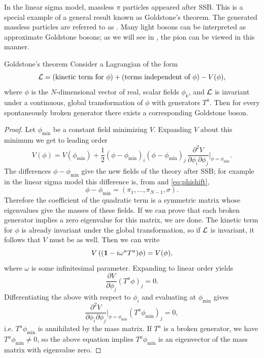 In the linear sigma model, massless $\pi$ particles appeared after
SSB. This is a special example of a general result
known as Goldstone's theorem. The generated massless particles are
referred to as . 
Many light bosons can be interpreted
as approximate Goldstone bosons; as we will see in ,
the pion can be viewed in this manner.
\begin{theorem}{Goldstone's theorem}{}
Consider a Lagrangian of the form
$$
  \mathcal{L}=(\text{kinetic term for $\phi$})+
        (\text{terms independent of $\phi$})-V(\phi),
$$
where $\phi$ is the $N$-dimensional vector of real, scalar fields
$\phi_k$, and $\mathcal{L}$ is invariant under a continuous, global
transformation of $\phi$ with generators $T^a$. Then for every
spontaneously broken generator there exists a corresponding
Goldstone boson. 
\begin{proof}
  Let $\phi_\text{min}$ be a constant field minimizing $V$. Expanding
  $V$ about this minimum we get to leading order
  $$
    V(\phi)= V(\phi_\text{min})
     +\frac{1}{2}
      (\phi-\phi_\text{min})_i(\phi-\phi_\text{min})_j\,
      \frac{\partial^2 V}{\partial\phi_i\partial\phi_j}
       \Big|_{\phi=\phi_\text{min}}.
  $$
  The differences $\phi-\phi_\text{min}$ give the new fields of the
  theory after SSB; for example in the linear sigma model this difference
  is, from  and \eqref{eq:phishift},
  $$
    \phi-\phi_\text{min}=(\pi_1,...,\pi_{N-1},\sigma).
  $$
  Therefore the coefficient of the quadratic term is a symmetric matrix
  whose eigenvalues give the masses of these fields. If we can prove
  that each broken generator implies a zero eigenvalue for this matrix,
  we are done.
  The kinetic term for $\phi$ is already invariant under the global
  transformation, so if $\mathcal{L}$ is invariant, it follows that $V$ must
  be as well. Then we can write
  $$
    V\left(({\mathbf 1}-i\omega^aT^a)\phi\right)=V(\phi),
  $$
  where $\omega$ is some infinitesimal parameter. Expanding to linear
  order yields
  $$
    \frac{\partial V}{\partial\phi_j}(T^a\phi)_j=0.
  $$
  Differentiating the above with respect to $\phi_i$ and evaluating at
  $\phi_\text{min}$ gives
  $$
     \frac{\partial^2 V}{\partial\phi_i\partial\phi_j}
      \Big|_{\phi=\phi_\text{min}}(T^a\phi_\text{min})_j=0,
  $$
  i.e. $T^a\phi_\text{min}$ is annihilated by the mass matrix. 
  If $T^a$ is a broken generator, we have $T^a\phi_\text{min}\neq0$,
  so the above equation implies $T^a\phi_\text{min}$ is an
  eigenvector of the mass matrix with eigenvalue zero.
\end{proof}
\end{theorem}

